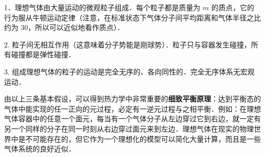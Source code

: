1．理想气体由大量运动的微观粒子组成．每个粒子都是质量为 $m$ 的质点，它的行为服从牛顿运动定律（注意，在标准状态下气体分子间平均距离和气体半径之比约为 $30$，所以可以近似地看作质点）．

2. 粒子间无相互作用（这意味着分子势能是刚球势）．粒子只与容器发生碰撞，所有碰撞都是弹性碰撞．

3. 组成理想气体的粒子的运动是完全无序的、各向同性的．完全无序体系无宏观运动．

由以上三条基本假设，可以得到热力学中非常重要的\textbf{细致平衡原理}：达到平衡态的气体中能实现的任一正向的元过程，必定有一逆元过程与之相平衡．例如：在理想气体容器中的任意一个面元，每当有一个气体分子从左边穿过它到右边，就一定有另一个同样的分子在同一时刻从右边穿过面元来到左边．理想气体在现实的物理世界中是不可能存在的，但它作为一个理想化的模型可以简化大量计算，而且是一些气体系统的良好近似．